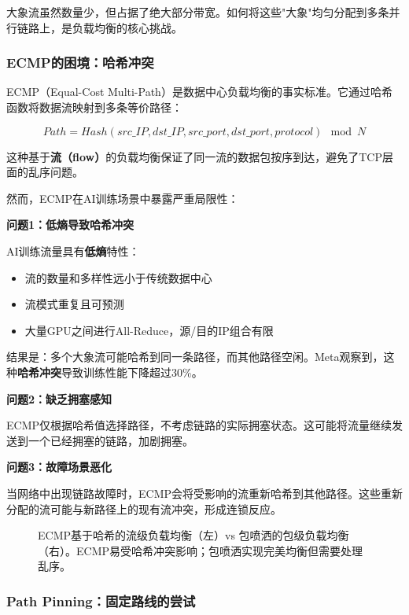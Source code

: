 大象流虽然数量少，但占据了绝大部分带宽。如何将这些"大象"均匀分配到多条并行链路上，是负载均衡的核心挑战。

\subsubsection{ECMP的困境：哈希冲突}

ECMP（Equal-Cost Multi-Path）是数据中心负载均衡的事实标准。它通过哈希函数将数据流映射到多条等价路径：

\begin{equation}
Path = Hash(src\_IP, dst\_IP, src\_port, dst\_port, protocol) \mod N
\end{equation}

这种基于\textbf{流（flow）}的负载均衡保证了同一流的数据包按序到达，避免了TCP层面的乱序问题。

然而，ECMP在AI训练场景中暴露严重局限性：

\textbf{问题1：低熵导致哈希冲突}

AI训练流量具有\textbf{低熵}特性：
\begin{itemize}
    \item 流的数量和多样性远小于传统数据中心
    \item 流模式重复且可预测
    \item 大量GPU之间进行All-Reduce，源/目的IP组合有限
\end{itemize}

结果是：多个大象流可能哈希到同一条路径，而其他路径空闲。Meta观察到，这种\textbf{哈希冲突}导致训练性能下降超过30\%。

\textbf{问题2：缺乏拥塞感知}

ECMP仅根据哈希值选择路径，不考虑链路的实际拥塞状态。这可能将流量继续发送到一个已经拥塞的链路，加剧拥塞。

\textbf{问题3：故障场景恶化}

当网络中出现链路故障时，ECMP会将受影响的流重新哈希到其他路径。这些重新分配的流可能与新路径上的现有流冲突，形成连锁反应。

\begin{figure}[htbp]
\centering

\caption{ECMP基于哈希的流级负载均衡（左）vs 包喷洒的包级负载均衡（右）。ECMP易受哈希冲突影响；包喷洒实现完美均衡但需要处理乱序。}
\label{fig:ecmp_vs_spray}
\end{figure}

\subsubsection{Path Pinning：固定路线的尝试}

